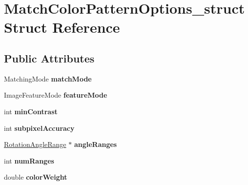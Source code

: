 \hypertarget{structMatchColorPatternOptions__struct}{\section{\-Match\-Color\-Pattern\-Options\-\_\-struct \-Struct \-Reference}
\label{structMatchColorPatternOptions__struct}
}
\subsection*{\-Public \-Attributes}
\begin{DoxyCompactItemize}
\item 
\hypertarget{structMatchColorPatternOptions__struct_ae733ca4271c6dca38c5f2689f0a511b1}{\-Matching\-Mode {\bfseries match\-Mode}}\label{structMatchColorPatternOptions__struct_ae733ca4271c6dca38c5f2689f0a511b1}

\item 
\hypertarget{structMatchColorPatternOptions__struct_abd2ebed8e431bdc3ca92a05a3b2e029e}{\-Image\-Feature\-Mode {\bfseries feature\-Mode}}\label{structMatchColorPatternOptions__struct_abd2ebed8e431bdc3ca92a05a3b2e029e}

\item 
\hypertarget{structMatchColorPatternOptions__struct_aa265353757eeadb6ab1c4f8da5f08e6d}{int {\bfseries min\-Contrast}}\label{structMatchColorPatternOptions__struct_aa265353757eeadb6ab1c4f8da5f08e6d}

\item 
\hypertarget{structMatchColorPatternOptions__struct_add97f122cfb0ab2e416d7dbe8af287ca}{int {\bfseries subpixel\-Accuracy}}\label{structMatchColorPatternOptions__struct_add97f122cfb0ab2e416d7dbe8af287ca}

\item 
\hypertarget{structMatchColorPatternOptions__struct_a57d2ec55e6f06440baa4e5e2d65a93e3}{\hyperlink{structRotationAngleRange__struct}{\-Rotation\-Angle\-Range} $\ast$ {\bfseries angle\-Ranges}}\label{structMatchColorPatternOptions__struct_a57d2ec55e6f06440baa4e5e2d65a93e3}

\item 
\hypertarget{structMatchColorPatternOptions__struct_ae6fad0a0b1484d03edfdbc58fad3acc1}{int {\bfseries num\-Ranges}}\label{structMatchColorPatternOptions__struct_ae6fad0a0b1484d03edfdbc58fad3acc1}

\item 
\hypertarget{structMatchColorPatternOptions__struct_a0bec234b3614423bcf22086ba6a1927e}{double {\bfseries color\-Weight}}\label{structMatchColorPatternOptions__struct_a0bec234b3614423bcf22086ba6a1927e}


\end{DoxyCompactItemize}
